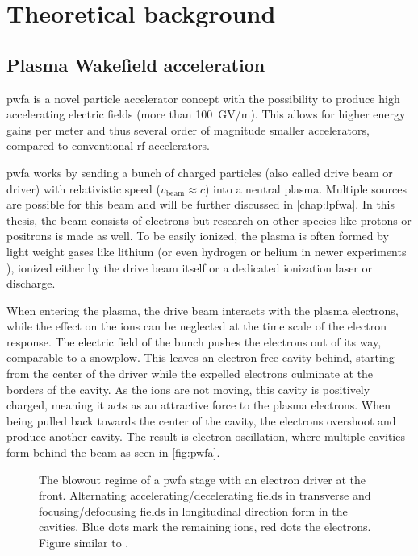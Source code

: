 \documentclass[bachelor_thesis]{subfiles}
\begin{document}
\chapter{Theoretical background} \label{chap:theory}
\section{Plasma Wakefield acceleration}
\Gls{pwfa} is a novel particle accelerator concept \cite{Chen1985} with the possibility to produce high accelerating electric fields (more than \qty{100}{\giga\volt/\m}). This allows for higher energy gains per meter
and thus several order of magnitude smaller accelerators, compared to conventional \gls{rf} accelerators.

\Gls{pwfa} works by sending a bunch of charged particles (also called drive beam or driver) with relativistic speed ($v_{\mathrm{beam}}\approx c$) into a neutral plasma. Multiple sources are possible for this beam and will be further discussed in \autoref{chap:lpfwa}.
In this thesis, the beam consists of electrons but research on other species like protons or positrons \cite{Gessner2016} is made as well. To be easily ionized, the plasma is often formed by light weight gases like lithium (or even hydrogen or helium in newer experiments \cite{Schoebel2022}), 
ionized either by the drive beam itself or a dedicated ionization laser or discharge.

When entering the plasma, the drive beam interacts with the plasma electrons, while the effect on the ions can be neglected at the time scale of the electron response. The electric field of the bunch pushes the electrons out of its way, comparable to a snowplow. 
This leaves an electron free cavity behind, starting from the center of the driver while the expelled electrons culminate at the borders of the cavity. As the ions are not moving, this cavity is positively charged, meaning it acts as an attractive force to the plasma electrons.
When being pulled back towards the center of the cavity, the electrons overshoot and produce another cavity. The result is electron oscillation, where multiple cavities form behind the beam as seen in \autoref{fig:pwfa}.

\begin{figure}
	\centering
	
	\caption{The blowout regime of a \gls{pwfa} stage with an electron driver at the front. Alternating accelerating/decelerating fields in transverse and focusing/defocusing fields in longitudinal direction form in the cavities. 
	Blue dots mark the remaining ions, red dots the electrons. Figure similar to \cite{Kurz2020}.}
	\label{fig:pwfa}
\end{figure}
\end{document}
